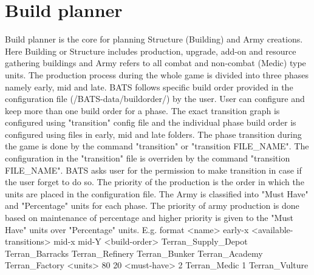 \section{Build planner}
Build planner is the core for planning Structure (Building) and Army creations. Here Building or Structure includes production, upgrade, add-on and resource gathering buildings and Army refers to all combat and non-combat (Medic) type units.
The production process during the whole game is divided into three phases namely early, mid and late. BATS follows specific build order provided in the configuration file (/BATS-data/buildorder/) by the user. User can configure and keep more than one build order for a phase. The exact transition graph is configured using "transition" config file and the individual phase build order is configured using files in early, mid and late folders.
The phase transition during the game is done by the command "transition" or "transition FILE_NAME". The configuration in the "transition" file is overriden by the command "transition FILE_NAME". BATS asks user for the permission to make transition in case if the user forget to do so.
The priority of the production is the order in which the units are placed in the configuration file. The Army is classified into "Must Have" and "Percentage" units for each phase. The priority of army production is done based on maintenance of percentage and higher priority is given to the "Must Have" units over "Percentage" units.
E.g. format
<name>
early-x
<available-transitions>
mid-x
mid-Y
<build-order>
Terran_Supply_Depot
Terran_Barracks
Terran_Refinery
Terran_Bunker
Terran_Academy
Terran_Factory
<units>
80%
20%
<must-have>
2 Terran_Medic
1 Terran_Vulture


